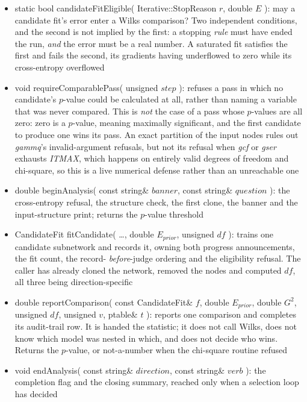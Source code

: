 \documentclass{report}
\begin{document}
\begin{itemize}
\begin{itemize}
\item static bool candidateFitEligible( Iterative::StopReason $r$,
      double $E$ ): may a candidate fit's error enter a Wilks
      comparison?  Two independent conditions, and the second is not
      implied by the first: a stopping {\em rule} must have ended the
      run, {\em and} the error must be a real number.  A saturated fit
      satisfies the first and fails the second, its gradients having
      underflowed to zero while its cross-entropy overflowed
\item void requireComparablePass( unsigned $step$ ): refuses a pass in
      which no candidate's $p$-value could be calculated at all, rather
      than naming a variable that was never compared.  This is {\em
      not} the case of a pass whose $p$-values are all zero: zero is a
      $p$-value, meaning maximally significant, and the first candidate
      to produce one wins its pass.  An exact partition of the input
      nodes rules out {\em gammq}'s invalid-argument refusals, but not
      its refusal when {\em gcf} or {\em gser} exhausts {\em ITMAX},
      which happens on entirely valid degrees of freedom and chi-square,
      so this is a live numerical defense rather than an unreachable one
\item double beginAnalysis( const string\& $banner$, const string\&
      $question$ ): the cross-entropy refusal, the structure check, the
      first clone, the banner and the input-structure print; returns the
      $p$-value threshold
\item CandidateFit fitCandidate( \ldots, double $E_{prior}$, unsigned
      $df$ ): trains one candidate subnetwork and records it, owning
      both progress announcements, the fit count, the record-{\em
      before}-judge ordering and the eligibility refusal.  The caller
      has already cloned the network, removed the nodes and computed
      $df$, all three being direction-specific
\item double reportComparison( const CandidateFit\& $f$, double
      $E_{prior}$, double $G^2$, unsigned $df$, unsigned $v$, ptable\&
      $t$ ): reports one comparison and completes its audit-trail row.
      It is handed the statistic; it does not call Wilks, does not know
      which model was nested in which, and does not decide who wins.
      Returns the $p$-value, or not-a-number when the chi-square routine
      refused
\item void endAnalysis( const string\& $direction$, const string\&
      $verb$ ): the completion flag and the closing summary, reached
      only when a selection loop has decided
\end{itemize}

\end{itemize}
\end{document}
